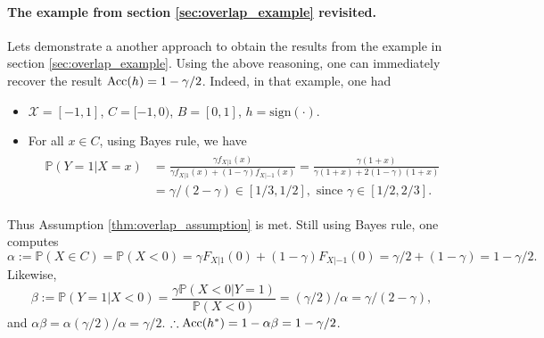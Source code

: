 \paragraph*{The example from section \ref{sec:overlap_example} revisited.} Lets
demonstrate a another approach to obtain the results from the example in section
\ref{sec:overlap_example}. Using the above reasoning, one can immediately
recover the result $\operatorname{Acc}(h)=1-\gamma/2$. Indeed, in that example, one had
\begin{itemize}
\item $\mathcal X = [-1,1]$, $C=[-1,0)$, $B=[0,1]$, $h=\text{sign}(\cdot)$.
\item For all $x \in C$, using Bayes rule, we have
  \begin{eqnarray*}
    \begin{split}
      \mathbb P(Y=1|X=x) &= \frac{\gamma f_{X|1}(x)}{\gamma
    f_{X|1}(x)+(1-\gamma)f_{X|-1}(x)}=\frac{\gamma (1+x)}{\gamma
    (1+x)+2(1-\gamma)(1+x)}\\
  &=\gamma/(2-\gamma) \in [1/3,1/2],\text{ since }\gamma \in [1/2,2/3].
\end{split}
  \end{eqnarray*}
\end{itemize}
Thus Assumption \eqref{thm:overlap_assumption} is met. Still using Bayes rule,
one computes
$$
\alpha:=\mathbb P(X \in C)=\mathbb P(X < 0) = \gamma
F_{X|1}(0)+(1-\gamma)F_{X|-1}(0)=\gamma/2 + (1-\gamma)=1-\gamma/2.
$$
Likewise,
$$
\beta := \mathbb P(Y=1|X<0)=\frac{\gamma\mathbb
  P(X<0|Y=1)}{\mathbb P(X<0)}=(\gamma/2)/\alpha=\gamma/(2-\gamma),
$$
and $\alpha\beta=\alpha(\gamma/2)/\alpha=\gamma/2$.
$\therefore \operatorname{Acc}(h^*)=1-\alpha\beta=1-\gamma/2$.

